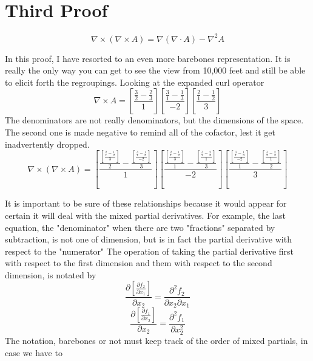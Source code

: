 \documentclass[12pt]{article}
\begin{document}
\section{Third Proof}
\begin{equation}
\nabla \times (\nabla \times A) = \nabla(\nabla \cdot A) - \nabla^2 A
\end{equation}

In this proof, I have resorted to an even more barebones representation.
It is really the only way you can get to see the view from 10,000 feet and still be able to elicit forth the regroupings.
Looking at the expanded curl operator
\begin{equation}
\nabla \times A = \left[ \frac{\frac{3}{2} - \frac{2}{3}}{1} \right] \left[ \frac{\frac{3}{1} - \frac{1}{3}}{-2} \right] \left[ \frac{\frac{2}{1} - \frac{1}{2}}{3} \right]
\end{equation}
The denominators are not really denominators, but the dimensions of the space. The second one is made negative to remind all of the cofactor, lest it get inadvertently dropped.
\begin{equation}
\nabla \times (\nabla \times A) = \left[ \frac{\frac{\left[ \frac{\frac{2}{1} - \frac{1}{2}}{3} \right]}{2} - \frac{\left[ \frac{\frac{3}{1} - \frac{1}{3}}{-2} \right]}{3}}{1} \right] \left[ \frac{\frac{\left[ \frac{\frac{2}{1} - \frac{1}{2}}{3} \right]}{1} - \frac{\left[ \frac{\frac{3}{2} - \frac{2}{3}}{1} \right]}{3}}{-2} \right] \left[ \frac{\frac{\left[ \frac{\frac{3}{1} - \frac{1}{3}}{-2} \right] }{1} - \frac{ \left[ \frac{\frac{3}{2} - \frac{2}{3}}{1} \right]}{2}}{3} \right]
\end{equation}

It is important to be sure of these relationships because it would appear for certain it will deal with the mixed partial derivatives. For example, the last equation, the "denominator" when there are two "fractions" separated by subtraction, is not one of dimension, but is in fact the partial derivative with respect to the "numerator" 
The operation of taking the partial derivative first with respect to the first dimension and them with respect to the second dimension, is notated by
\begin{equation}
\frac{\partial \left[ \frac{\partial f_2}{\partial x_1}\right]}{\partial x_2} = \frac {\partial^2 f_2}{\partial x_2 \partial x_1}
\end{equation}
\begin{equation}
\frac{\partial \left[ \frac{\partial f_1}{\partial x_2}\right]}{\partial x_2} = \frac {\partial^2  f_1}{\partial x_2^2}
\end{equation}
The notation, barebones or not must keep track of the order of mixed partials, in case we have to 
\end{document}
